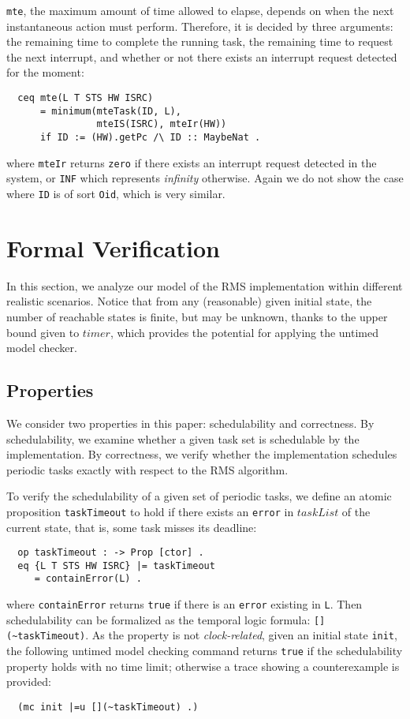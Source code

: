\documentclass[10pt,journal]{IEEEtran}
\newcommand{\hide}[1]{\ignorespaces}
\begin{document}
{\verb|mte|, the maximum amount of time allowed to elapse, depends on
when the next instantaneous action must perform. Therefore, it is
decided by three arguments: the remaining time to complete the running
task, the remaining time to request the next interrupt, and whether or
not there exists an interrupt request detected for the moment:
\begin{verbatim}
  ceq mte(L T STS HW ISRC)
      = minimum(mteTask(ID, L),
                mteIS(ISRC), mteIr(HW))
      if ID := (HW).getPc /\ ID :: MaybeNat .
\end{verbatim}
where \verb|mteIr| returns \verb|zero| if there exists an interrupt
request detected in the system, or \verb|INF| which represents
\emph{infinity} otherwise. Again we do not show the case where
\verb|ID| is of sort \verb|Oid|, which is very similar. 
\hide{
We should
point out that \verb|mteTask| computes the remaining time to reach the
maximum of the computation requirement of the task, since that is the
time at which a \verb|task-finish| transition \emph{must} happen.
}

\section{Formal Verification}
\label{s:verification}
In this section, we analyze our model of the RMS implementation within
different realistic scenarios.  Notice that from any (reasonable)
given initial state, the number of reachable states is finite, but may
be unknown, thanks to the upper bound given to $timer$, which provides
the potential for applying the untimed model checker.

\subsection{Properties}
We consider two properties in this paper: schedulability and
correctness. By schedulability, we examine whether a given task set is
schedulable by the implementation. By correctness, we verify whether
the implementation schedules periodic tasks exactly with respect to
the RMS algorithm.

To verify the schedulability of a given set of periodic tasks, we
define an atomic proposition \verb|taskTimeout| to hold if there
exists an \verb|error| in $taskList$ of the current state, that is,
some task misses its deadline:
\begin{verbatim}
  op taskTimeout : -> Prop [ctor] .
  eq {L T STS HW ISRC} |= taskTimeout 
     = containError(L) .
\end{verbatim}
where \verb|containError| returns \verb|true| if there is an
\verb|error| existing in \verb|L|. Then schedulability can be
formalized as the temporal logic formula: \verb|[](~taskTimeout)|. As
the property is not \emph{clock-related}, given an initial state
\verb|init|, the following untimed model checking command returns
\verb|true| if the schedulability property holds with no time limit;
otherwise a trace showing a counterexample is provided:
\begin{verbatim}
  (mc init |=u [](~taskTimeout) .)
\end{verbatim}

}
\end{document}
